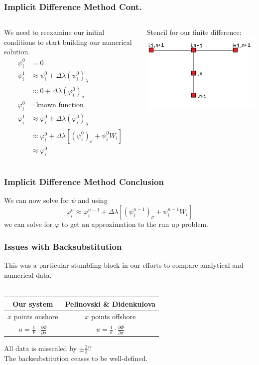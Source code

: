 \documentclass[xcolor=dvipsnames]{beamer}
\begin{document}
\begin{frame}
\frametitle{Implicit Difference Method Cont.}

\begin{columns}
We need to reexamine our initial conditions to start building our numerical solution.\\
\begin{align*}
\psi^{0}_i&=0\\
\psi_i^1&\approx\psi^0_i+\Delta\lambda (\psi^0_i)_\lambda\\
&\approx0+\Delta\lambda(\varphi^0_i)_\sigma\\
\varphi^0_i&=\text{known function}\\
\varphi^1_i&\approx\varphi^0_i+\Delta\lambda(\varphi^0_i)_\lambda\\
&\approx\varphi^0_i+\Delta\lambda[(\psi^0_i)_\sigma+\psi^0_iW_i]\\
&\approx\varphi^0_i
\end{align*}

\vspace{.2\textheight}
Stencil for our finite difference:\vspace{-5mm}
\includegraphics{Stencil_for_Finite_difference.png}
\end{columns}
\end{frame}

\begin{frame}
\frametitle{Implicit Difference Method Conclusion}
We can now solve for $\psi$ and using
\[
 \varphi^n_i\approx \varphi^{n-1}_i+\Delta\lambda[(\psi^{n-1}_i)_\sigma+\psi^{n-1}_iW_i]
 \]
we can solve for $\varphi$ to get an approximation to the run up problem. 
\end{frame}

\begin{frame}
\frametitle{Issues with Backsubstitution}
This was a particular stumbling block in our efforts to compare analytical and numerical data.\\
\quad\\
\begin{center}
\begin{tabular}{c c}
Our system & Pelinovski \& Didenkulova\\
\hline
$x$ points onshore & $x$ points offshore\\
$u = \frac{1}{F} \cdot \frac{\partial \Phi}{\partial \sigma}$ & $u = \frac{1}{\sigma} \cdot \frac{\partial \Phi}{\partial \sigma}$
\end{tabular}
\end{center}
All data is misscaled by $\pm \frac{2}{3}$!!\\
The backsubstitution ceases to be well-defined.
\end{frame}
\end{document}
